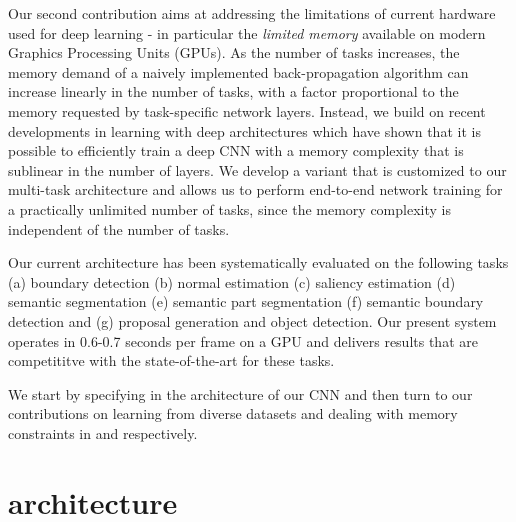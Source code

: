 \documentclass[10pt,twocolumn,letterpaper]{article}
\begin{document}
Our second contribution aims at addressing the limitations of current hardware used for deep learning - in particular the {\em limited memory} available on modern Graphics Processing Units (GPUs).
As the number of tasks increases, the memory demand of a naively implemented back-propagation algorithm can increase linearly in the number of tasks, with a factor proportional to the memory requested by  task-specific network layers. Instead, we build on recent developments in  learning with deep architectures \cite{GruslysMDLG16,ChenXZG16} which have shown that it is possible to efficiently train a deep CNN with a  memory complexity that is sublinear in the number of layers. We develop a variant that is customized to our multi-task architecture and allows us to perform end-to-end network training for a practically unlimited number of tasks, since the memory complexity is independent of the number of tasks. 

Our current architecture has been systematically evaluated on the following tasks (a) boundary detection (b) normal estimation (c) saliency estimation (d) semantic segmentation (e) semantic part segmentation (f) semantic boundary detection 
and (g) proposal generation and object detection.
Our present system operates in 0.6-0.7 seconds per frame on a GPU and delivers  results that are competititve with the state-of-the-art for these tasks.
  


We start by specifying in  the architecture of our CNN and then turn to our contributions on learning from diverse datasets  and dealing with memory constraints in   and  respectively. 


\section{\ubernet architecture}
\label{arch}
\end{document}
